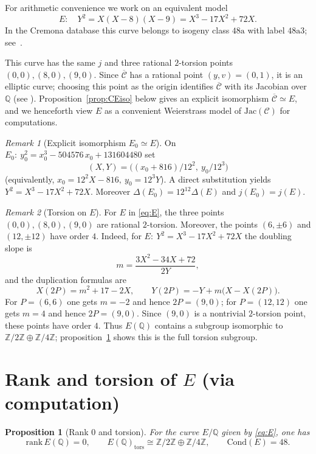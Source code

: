 \documentclass[12pt]{article}
\newtheorem{proposition}{Proposition}
\theoremstyle{remark}
\newtheorem{remark}{Remark}
\theoremstyle{definition}
\begin{document}
For arithmetic convenience we work on an equivalent model
\begin{equation}\label{eq:E}
E:\quad Y^2=X(X-8)(X-9)=X^3-17X^2+72X.
\end{equation}
In the Cremona database this curve belongs to isogeny class $48\mathrm{a}$ with label $48\mathrm{a}3$; see~\cite{CremonaEC,LMFDB48a3}.

This curve has the same $j$ and three rational $2$-torsion points $(0,0),(8,0),(9,0)$.
Since $\overline{\mathcal{C}}$ has a rational point $(y,v)=(0,1)$, it is an elliptic curve; choosing this point as the origin identifies $\overline{\mathcal{C}}$ with its Jacobian over $\mathbb{Q}$ (see \cite{Cassels}).
Proposition~\ref{prop:CEiso} below gives an explicit isomorphism $\overline{\mathcal{C}}\simeq E$, and we henceforth view $E$ as a convenient Weierstrass model of $\mathrm{Jac}(\mathcal{C})$ for computations.

\begin{remark}[Explicit isomorphism $E_0\simeq E$]
On $E_0:\ y_0^2=x_0^3-504576\,x_0+131604480$ set
\[
(X,Y)=\bigl((x_0+816)/12^{2},\ y_0/12^{3}\bigr)
\]
(equivalently, \(x_0=12^{2}X-816,\ y_0=12^{3}Y\)).
A direct substitution yields \(Y^{2}=X^{3}-17X^{2}+72X\).
Moreover \(\Delta(E_0)=12^{12}\Delta(E)\) and \(j(E_0)=j(E)\).
\end{remark}

\begin{remark}[Torsion on $E$]\label{rem:tors}
For $E$ in \eqref{eq:E}, the three points $(0,0),(8,0),(9,0)$ are rational $2$-torsion.
Moreover, the points $(6,\pm 6)$ and $(12,\pm 12)$ have order $4$.
Indeed, for $E:\ Y^2=X^3-17X^2+72X$ the doubling slope is
\[
m=\frac{3X^2-34X+72}{2Y},
\]
and the duplication formulas are
\[
X(2P)=m^2+17-2X,\qquad Y(2P)=-Y+m\bigl(X-X(2P)\bigr).
\]
For $P=(6,6)$ one gets $m=-2$ and hence $2P=(9,0)$; for $P=(12,12)$ one gets $m=4$ and hence $2P=(9,0)$.
Since $(9,0)$ is a nontrivial $2$-torsion point, these points have order $4$.
Thus $E(\mathbb{Q})$ contains a subgroup isomorphic to $\mathbb{Z}/2\mathbb{Z}\oplus\mathbb{Z}/4\mathbb{Z}$; proposition~\ref{prop:rank0} shows this is the full torsion subgroup.
\end{remark}

\section{Rank and torsion of $E$ (via computation)}\label{sec:rank}
\begin{proposition}[Rank $0$ and torsion]\label{prop:rank0}
For the curve $E/\mathbb{Q}$ given by \eqref{eq:E}, one has
\[
\mathrm{rank}\,E(\mathbb{Q})=0,\qquad
E(\mathbb{Q})_{\mathrm{tors}}\cong \mathbb{Z}/2\mathbb{Z}\oplus\mathbb{Z}/4\mathbb{Z},\qquad
\mathrm{Cond}(E)=48.
\]
\end{proposition}
\end{document}
